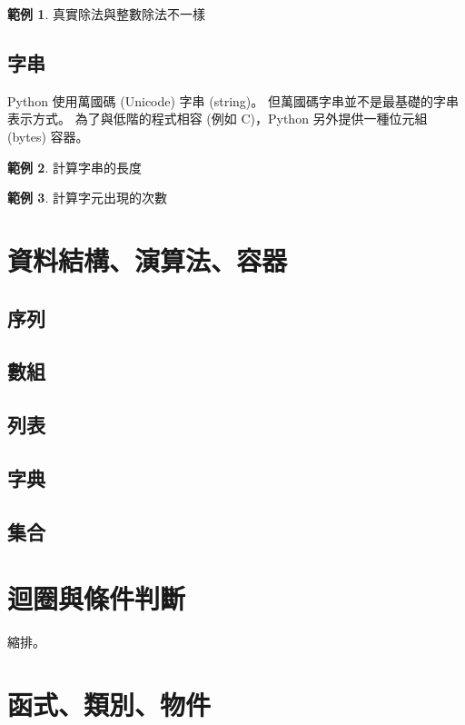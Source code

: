 \documentclass[a4paper,12pt]{book}
\theoremstyle{definition}
\newtheorem{example}{範例}[chapter]
\begin{document}
\begin{example}
真實除法與整數除法不一樣
\end{example}

\section{字串}

Python 使用萬國碼 (Unicode) 字串 (string)。
但萬國碼字串並不是最基礎的字串表示方式。
為了與低階的程式相容 (例如 C)，Python 另外提供一種位元組 (bytes) 容器。

\begin{example}
計算字串的長度
\end{example}

\begin{example}
計算字元出現的次數
\end{example}

\chapter{資料結構、演算法、容器}

\section{序列}

\section{數組}

\section{列表}

\section{字典}

\section{集合}

\chapter{迴圈與條件判斷}

縮排。

\chapter{函式、類別、物件}
\end{document}
